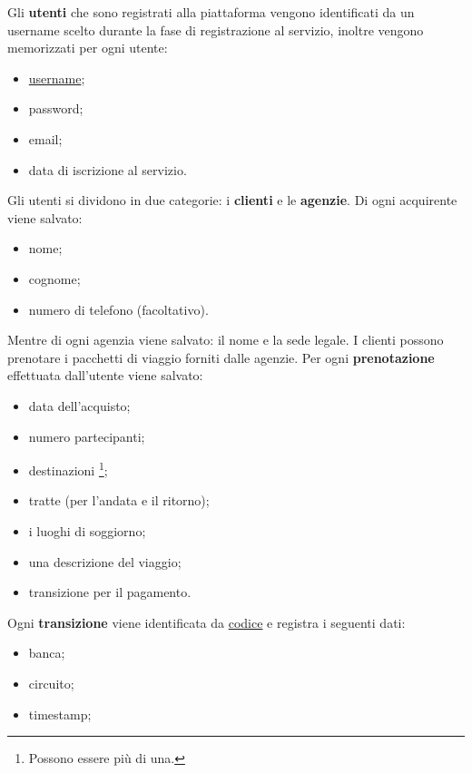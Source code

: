 %
%
Gli \textbf{utenti} che sono registrati alla piattaforma vengono identificati da un username scelto durante la fase di registrazione al servizio, inoltre vengono memorizzati per ogni utente:
\begin{multicols}{2}
\begin{itemize}
    \item \underline{username};
    \item password;
    \item email;
    \item data di iscrizione al servizio.
\end{itemize}
\end{multicols}
\noindent
%
%
Gli utenti si dividono in due categorie: i \textbf{clienti} e le \textbf{agenzie}. Di ogni acquirente viene salvato:
\begin{multicols}{2}
\begin{itemize}
    \item nome;
    \item cognome;
    \item numero di telefono (facoltativo).
\end{itemize}
\end{multicols}
\noindent
Mentre di ogni agenzia viene salvato: il nome e la sede legale.
%
%
I clienti possono prenotare i pacchetti di viaggio forniti dalle agenzie. Per ogni \textbf{prenotazione} effettuata dall'utente viene salvato:
\begin{multicols}{2}
\begin{itemize}
    \item data dell'acquisto;
    \item numero partecipanti;
    \item destinazioni \footnote{Possono essere più di una.};
    \item tratte (per l'andata e il ritorno);
    \item i luoghi di soggiorno;
    \item una descrizione del viaggio;
    \item transizione per il pagamento.
\end{itemize}
\end{multicols}
\noindent
%
%
Ogni \textbf{transizione} viene identificata da \underline{codice} e registra i seguenti dati:
\begin{multicols}{2}
\begin{itemize}
    \item banca;
    \item circuito;
    \item timestamp;
\end{itemize}
\end{multicols}
